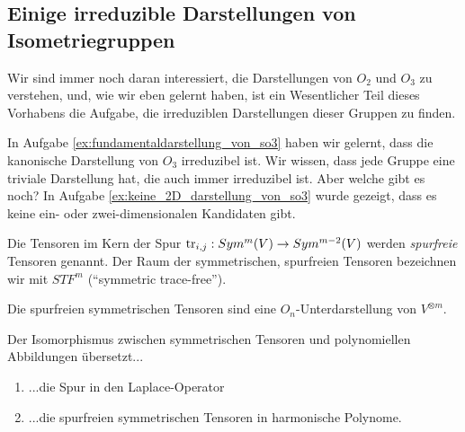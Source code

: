 \subsection{Einige irreduzible Darstellungen von Isometriegruppen}

\begin{remark}
Wir sind immer noch daran interessiert, die Darstellungen von $O_2$ und $O_3$ zu verstehen, und, wie wir eben gelernt haben, ist ein Wesentlicher Teil dieses Vorhabens die Aufgabe, die irreduziblen Darstellungen dieser Gruppen zu finden.

In Aufgabe \ref{ex:fundamentaldarstellung_von_so3} haben wir gelernt, dass die kanonische Darstellung von $O_3$ irreduzibel ist. Wir wissen, dass jede Gruppe eine triviale Darstellung hat, die auch immer irreduzibel ist. Aber welche gibt es noch? In Aufgabe \ref{ex:keine_2D_darstellung_von_so3} wurde gezeigt, dass es keine ein- oder zwei-dimensionalen Kandidaten gibt.
\end{remark}

\begin{definition}
Die Tensoren im Kern der Spur $\operatorname{tr}_{i,j} : Sym^m(V) \to Sym^{m-2}(V)$ werden \emph{spurfreie} Tensoren genannt. Der Raum der symmetrischen, spurfreien Tensoren bezeichnen wir mit $STF^m$ (\enquote{symmetric trace-free}).
\end{definition}

\begin{lemma}
Die spurfreien symmetrischen Tensoren sind eine $O_n$-Unterdarstellung von $V^{\otimes m}$.
\end{lemma}

\begin{lemma}
Der Isomorphismus zwischen symmetrischen Tensoren und polynomiellen Abbildungen übersetzt...
\begin{enumerate}
\item ...die Spur in den Laplace-Operator
\item ...die spurfreien symmetrischen Tensoren in harmonische Polynome.
\end{enumerate}
\end{lemma}



